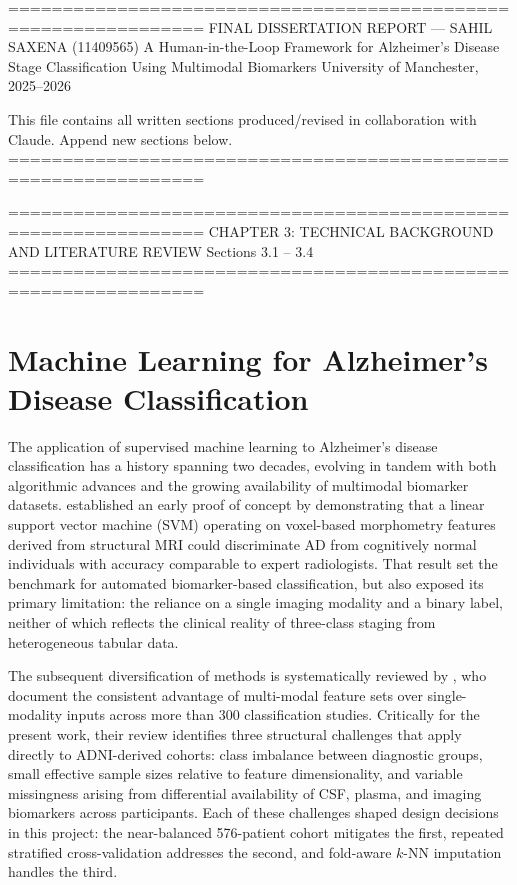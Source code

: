 ================================================================
  FINAL DISSERTATION REPORT — SAHIL SAXENA (11409565)
  A Human-in-the-Loop Framework for Alzheimer's Disease
  Stage Classification Using Multimodal Biomarkers
  University of Manchester, 2025–2026

  This file contains all written sections produced/revised
  in collaboration with Claude. Append new sections below.
================================================================


================================================================
  CHAPTER 3: TECHNICAL BACKGROUND AND LITERATURE REVIEW
  Sections 3.1 -- 3.4
================================================================

\section{Machine Learning for Alzheimer's Disease Classification}
\label{sec:ml-ad}

The application of supervised machine learning to Alzheimer's disease
classification has a history spanning two decades, evolving in tandem with both
algorithmic advances and the growing availability of multimodal biomarker
datasets. \citet{kloppel2008automatic} established an early proof of concept by
demonstrating that a linear support vector machine (SVM) operating on
voxel-based morphometry features derived from structural MRI could discriminate
AD from cognitively normal individuals with accuracy comparable to expert
radiologists. That result set the benchmark for automated biomarker-based
classification, but also exposed its primary limitation: the reliance on a
single imaging modality and a binary label, neither of which reflects the
clinical reality of three-class staging from heterogeneous tabular data.

The subsequent diversification of methods is systematically reviewed by
\citet{rathore2017review}, who document the consistent advantage of multi-modal
feature sets over single-modality inputs across more than 300 classification
studies. Critically for the present work, their review identifies three
structural challenges that apply directly to ADNI-derived cohorts: class
imbalance between diagnostic groups, small effective sample sizes relative to
feature dimensionality, and variable missingness arising from differential
availability of CSF, plasma, and imaging biomarkers across participants. Each of
these challenges shaped design decisions in this project: the near-balanced
576-patient cohort mitigates the first, repeated stratified cross-validation
addresses the second, and fold-aware $k$-NN imputation handles the third.

